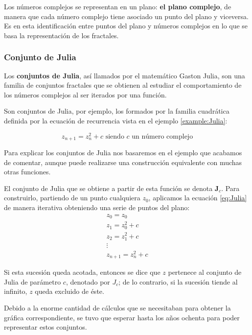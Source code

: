 Los números complejos se representan en un plano: \textbf{el plano complejo}, de manera que cada número complejo tiene asociado un punto del plano y viceversa. Es en esta identificación entre puntos del plano y números complejos en lo que se basa la representación de los fractales.

\subsubsection{Conjunto de Julia}
\begin{definition}
Los \textbf{conjuntos de Julia}, así llamados por el matemático Gaston Julia, son una familia de conjuntos fractales que se obtienen al estudiar el comportamiento de los números complejos al ser iterados por una función.

Son conjuntos de Julia, por ejemplo, los formados por la familia cuadrática definida por la ecuación de recurrencia vista en el ejemplo \ref{example:Julia}:

\begin{equation}
z_{n+1} = z_n^2+c \text{ siendo } c \text{ un número complejo}
\end{equation}\label{eq:Julia}

\end{definition}

Para explicar los conjuntos de Julia nos basaremos en el ejemplo que acabamos de comentar, aunque puede realizarse una construcción equivalente con muchas otras funciones.

El conjunto de Julia que se obtiene a partir de esta función se denota \textbf{J$_c$}. Para construirlo, partiendo de un punto cualquiera $z_0$, aplicamos la ecuación \ref{eq:Julia} de manera iterativa obteniendo una serie de puntos del plano:
\[\begin{array}{l}
z_0=z_0\\
z_1=z_0^2+c \\
z_2 = z_1^2 + c \\
\vdots \\
z_{n+1} = z_n^2+c
\end{array}\]

Si esta sucesión queda acotada, entonces se dice que $z$ pertenece al conjunto de Julia de parámetro $c$, denotado por $J_c$; de lo contrario, si la sucesión tiende al infinito, $z$ queda excluido de éste.

Debido a la enorme cantidad de cálculos que se necesitaban para obtener la gráfica correspondiente, se tuvo que esperar hasta los años ochenta para poder representar estos conjuntos.

